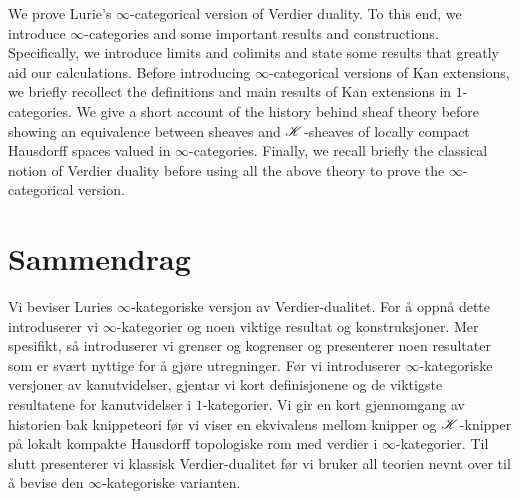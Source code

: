 \documentclass[../thesis.tex]{subfiles}
\begin{document}
We prove Lurie's $\infty$-categorical version of Verdier duality.
To this end, we introduce $\infty$-categories and some important results and constructions.
Specifically, we introduce limits and colimits and state some results that greatly aid our calculations.
Before introducing $\infty$-categorical versions of Kan extensions, we briefly recollect the definitions and main results of Kan extensions in $1$-categories.
We give a short account of the history behind sheaf theory before showing an equivalence between sheaves and $\mathscr{K}$-sheaves of locally compact Hausdorff spaces valued in $\infty$-categories.
Finally, we recall briefly the classical notion of Verdier duality before using all the above theory to prove the $\infty$-categorical version.


    {\let\clearpage\relax\chapter*{Sammendrag}}
Vi beviser Luries $\infty$-kategoriske versjon av Verdier-dualitet.
For å oppnå dette introduserer vi $\infty$-kategorier og noen viktige resultat og konstruksjoner.
Mer spesifikt, så introduserer vi grenser og kogrenser og presenterer noen resultater som er svært nyttige for å gjøre utregninger.
Før vi introduserer $\infty$-kategoriske versjoner av kanutvidelser, gjentar vi kort definisjonene og de viktigste resultatene for kanutvidelser i $1$-kategorier.
Vi gir en kort gjennomgang av historien bak knippeteori før vi viser en ekvivalens mellom knipper og $\mathscr{K}$-knipper på lokalt kompakte Hausdorff topologiske rom med verdier i $\infty$-kategorier.
Til slutt presenterer vi klassisk Verdier-dualitet før vi bruker all teorien nevnt over til å bevise den $\infty$-kategoriske varianten.




\end{document}
